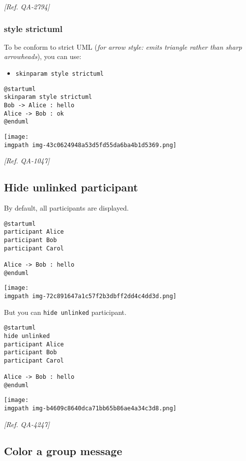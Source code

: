 \textit{[Ref. QA-2794]}


\subsubsection{style strictuml}
To be conform to strict UML (\textit{for arrow style: emits triangle rather than sharp arrowheads}), you can use:
\begin{itemize}
\item \texttt{skinparam style strictuml}
\end{itemize}
\begin{verbatim}
@startuml
skinparam style strictuml
Bob -> Alice : hello
Alice -> Bob : ok
@enduml
\end{verbatim}
\begin{center}
\texttt{[image: \\imgpath img-43c0624948a53d5fd55da6ba4b1d5369.png]}
\end{center}
\textit{[Ref. QA-1047]}
%
%
\subsection{Hide unlinked participant }


By default, all participants are displayed.
\begin{verbatim}
@startuml
participant Alice
participant Bob
participant Carol

Alice -> Bob : hello
@enduml
\end{verbatim}
\begin{center}
\texttt{[image: \\imgpath img-72c891647a1c57f2b3dbff2dd4c4dd3d.png]}
\end{center}


But you can \texttt{hide unlinked} participant.
\begin{verbatim}
@startuml
hide unlinked
participant Alice
participant Bob
participant Carol

Alice -> Bob : hello
@enduml
\end{verbatim}
\begin{center}
\texttt{[image: \\imgpath img-b4609c8640dca71bb65b86ae4a34c3d8.png]}
\end{center}




\textit{[Ref. QA-4247]}
%
%
\subsection{Color a group message}




